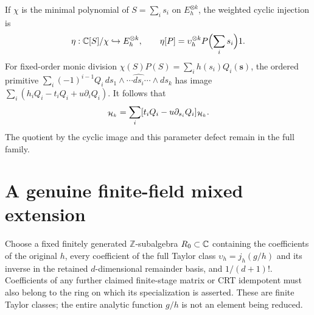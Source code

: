 If $\chi$ is the minimal polynomial of $S=\sum_i s_i$ on
$E_h^{\otimes k}$, the weighted cyclic injection is
\begin{equation}
 \eta:\mathbb C[S]/\chi\hookrightarrow E_h^{\otimes k},\qquad
 \eta[P]=\upsilon_h^{\otimes k}P\Bigl(\sum_i s_i\Bigr)1.
 \label{BC:eq:eta}
\end{equation}
For fixed-order monic division
$\chi(S)P(S)=\sum_i h(s_i)Q_i(\mathbf s)$, the ordered primitive
$\sum_i(-1)^{i-1}Q_i\,ds_1\wedge\cdots\widehat{ds_i}\cdots\wedge ds_k$
has image $\sum_i(h_iQ_i-t_iQ_i+u\partial_iQ_i)$.
It follows that
\begin{equation}
 [\chi(S)P(S)]_{\HH_k}
    =\sum_i[t_iQ_i-u\partial_{s_i}Q_i]_{\HH_k}.
 \label{BC:eq:cyclic-defect}
\end{equation}
The quotient by the cyclic image and this parameter defect remain in
the full family.

\section{A genuine finite-field mixed extension}

Choose a fixed finitely generated \(\mathbb Z\)-subalgebra
\(R_0\subset\mathbb C\) containing the coefficients of the original \(h\),
every coefficient of the full Taylor class
\(\upsilon_h=j_h(g/h)\) and its inverse in the retained
\(d\)-dimensional remainder basis, and \(1/(d+1)!\).
Coefficients of any further claimed finite-stage matrix or CRT
idempotent must also belong to the ring on which its specialization
is asserted.  These are finite Taylor classes; the entire analytic
function \(g/h\) is not an element being reduced.

